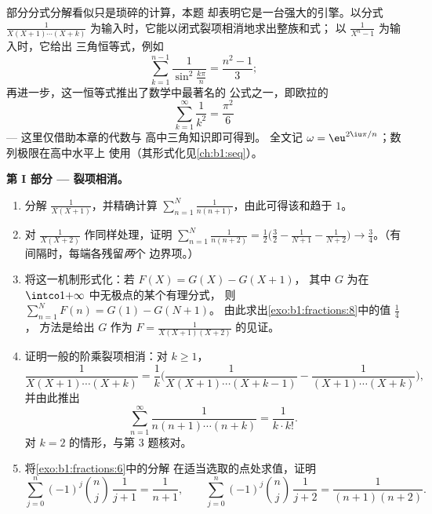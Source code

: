 \begin{problem}\label{pb:b1:fractions:1}
部分分式分解看似只是琐碎的计算，本题
却表明它是一台强大的引擎。以分式
$\frac1{X(X+1)\cdots(X+k)}$ 为输入时，它能以闭式裂项相消地求出整族和式；
以 $\frac1{X^n - 1}$ 为输入时，它给出
三角恒等式，例如
\[
\sum_{k=1}^{n-1}\frac{1}{\sin^2\frac{k\pi}{n}} = \frac{n^2-1}{3} ;
\]
再进一步，这一恒等式推出了数学中最著名的
公式之一，即欧拉的
\[
\sum_{k=1}^{\infty}\frac1{k^2} = \frac{\pi^2}{6}
\]
--- 这里仅借助本章的代数与
高中三角知识即可得到。
全文记 $\omega = \eu^{2\iu\pi/n}$；数列极限在高中水平上
使用（其形式化见\cref{ch:b1:seq}）。

\medskip
\noindent\textbf{第 I 部分 --- 裂项相消。}
\begin{enumerate}
  \item 分解 $\frac1{X(X+1)}$，并精确计算 $\sum_{n=1}^{N}
        \frac1{n(n+1)}$，由此可得该和趋于
        $1$。
  \item 对 $\frac1{X(X+2)}$ 作同样处理，证明 $\sum_{n=1}^{N}
        \frac1{n(n+2)} = \frac12\bigl(\frac32 - \frac1{N+1} -
        \frac1{N+2}\bigr) \to \frac34$。（有间隔时，每端各残留\emph{两}个
        边界项。）
  \item 将这一机制形式化：若 $F(X) = G(X) - G(X+1)$，
        其中 $G$ 为在 $\intco1{+\infty}$ 中无极点的某个有理分式，
        则 $\sum_{n=1}^N F(n) = G(1) - G(N+1)$。
        由此求出\cref{exo:b1:fractions:8}中的值 $\frac14$，
        方法是给出 $G$ 作为 $F = \frac1{X(X+1)(X+2)}$ 的见证。
  \item 证明一般的阶乘裂项相消：对 $k \geq 1$，
        \[
        \frac{1}{X(X+1)\cdots(X+k)}
        = \frac1k\biggl(\frac{1}{X(X+1)\cdots(X+k-1)}
        - \frac{1}{(X+1)\cdots(X+k)}\biggr),
        \]
        并由此推出
        \[
        \sum_{n=1}^{\infty}\frac{1}{n(n+1)\cdots(n+k)}
        = \frac{1}{k \cdot k!} .
        \]
        对 $k = 2$ 的情形，与第 3 题核对。
  \item 将\cref{exo:b1:fractions:6}中的分解
        在适当选取的点处求值，证明
        \[
        \sum_{j=0}^{n}(-1)^j\binom nj\,\frac1{j+1}
        = \frac1{n+1},
        \qquad
        \sum_{j=0}^{n}(-1)^j\binom nj\,\frac1{j+2}
        = \frac1{(n+1)(n+2)} .
        \]
\end{enumerate}


\end{problem}
